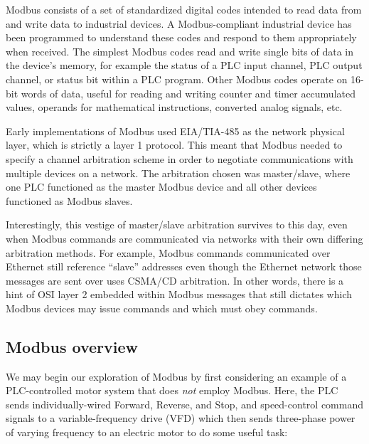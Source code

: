 Modbus consists of a set of standardized digital codes intended to read data from and write data to industrial devices.  A Modbus-compliant industrial device has been programmed to understand these codes and respond to them appropriately when received.  The simplest Modbus codes read and write single bits of data in the device's memory, for example the status of a PLC input channel, PLC output channel, or status bit within a PLC program.  Other Modbus codes operate on 16-bit words of data, useful for reading and writing counter and timer accumulated values, operands for mathematical instructions, converted analog signals, etc.

\vskip 10pt

Early implementations of Modbus used EIA/TIA-485 as the network physical layer, which is strictly a layer 1 protocol.  This meant that Modbus needed to specify a channel arbitration scheme in order to negotiate communications with multiple devices on a network.  The arbitration chosen was master/slave, where one PLC functioned as the master Modbus device and all other devices functioned as Modbus slaves.

Interestingly, this vestige of master/slave arbitration survives to this day, even when Modbus commands are communicated via networks with their own differing arbitration methods.  For example, Modbus commands communicated over Ethernet still reference ``slave'' addresses even though the Ethernet network those messages are sent over uses CSMA/CD arbitration.  In other words, there is a hint of OSI layer 2 embedded within Modbus messages that still dictates which Modbus devices may issue commands and which must obey commands.








\filbreak
\subsection{Modbus overview}

We may begin our exploration of Modbus by first considering an example of a PLC-controlled motor system that does \textit{not} employ Modbus.  Here, the PLC sends individually-wired Forward, Reverse, and Stop, and speed-control command signals to a variable-frequency drive (VFD) which then sends three-phase power of varying frequency to an electric motor to do some useful task:        

